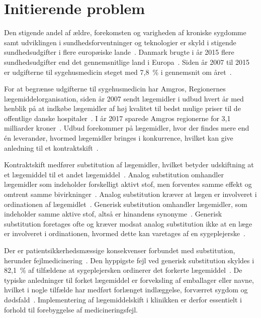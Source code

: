 \chapter{Initierende problem}
Den stigende andel af ældre, forekomsten og varigheden af kroniske sygdomme samt udviklingen i sundhedsforventninger og teknologier er skyld i stigende sundhedsudgifter i flere europæiske lande~\citep{Ess2003}. Danmark brugte i år 2015 flere sundhedsudgifter end det gennemsnitlige land i Europa~\citep{EU2017}. Siden år 2007 til 2015 er udgifterne til sygehusmedicin steget med 7,8~\% i gennemsnit om året~\citep{Sundhed2016}.

For at begrænse udgifterne til sygehusmedicin har Amgros, Regionernes lægemiddelorganisation, siden år 2007 sendt lægemidler i udbud hvert år med henblik på at indkøbe lægemidler af høj kvalitet til bedst mulige priser til de offentlige danske hospitaler~\citep{Amgros2018b}. I år 2017 sparede Amgros regionerne for 3,1 milliarder kroner~\citep{Amgros2017b}. Udbud forekommer på lægemidler, hvor der findes mere end én leverandør, hvormed lægemidler bringes i konkurrence, hvilket kan give anledning til et kontraktskift~\citep{Amgros2015}.

Kontraktskift medfører substitution af lægemidler, hvilket betyder udskiftning at et lægemiddel til et andet lægemiddel~\citep{DanskSelskabforPatientsikkerhed2009}. %
Analog substitution omhandler lægemidler som indeholder forskelligt aktivt stof, men forventes samme effekt og omtrent samme bivirkninger~\citep{Kairi2017}. Analog substitution kræver at lægen er involveret i ordinationen af lægemidlet~\citep{DanskSelskabforPatientsikkerhed2009}.
Generisk substitution omhandler lægemidler, som indeholder samme aktive stof, altså er hinandens synonyme~\citep{Kairi2017}. Generisk substitution foretages ofte og kræver modsat analog substitution ikke at en læge er involveret i ordinationen, hvormed dette kan varetages af en sygeplejerske~\citep{DanskSelskabforPatientsikkerhed2009}. 

Der er patientsikkerhedsmæssige konsekvenser forbundet med substitution, herunder fejlmedicinering~\citep{Hakonsen2010}. %
Den hyppigste fejl ved generisk substitution skyldes i 82,1~\% af tilfældene at sygeplejersken ordinerer det forkerte lægemiddel~\citep{Hakonsen2010}. De typiske anledninger til forket lægemiddel er forveksling af emballager eller navne, hvilket i nogle tilfælde har medført forlænget indlæggelse, forværret sygdom og dødsfald~\citep{DanskSelskabforPatientsikkerhed2009}. Implementering af lægemiddelskift i klinikken er derfor essentielt i forhold til forebyggelse af medicineringsfejl.

